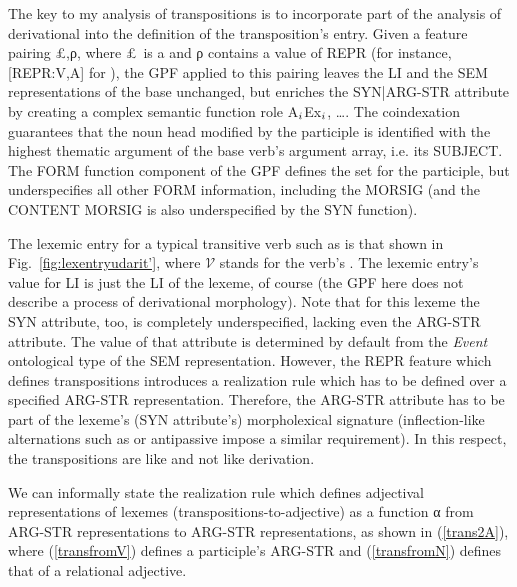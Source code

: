 \documentclass[output=paper,
modfonts
]{LSP/langsci}
\begin{document}
The key to my analysis of transpositions is to incorporate part of the analysis of derivational  into the definition of the transposition’s entry. Given a feature pairing \lab\pounds,ρ\rab, where \pounds\ is a  and ρ contains a value of REPR (for instance, [REPR:\lab V,A\rab] for ), the GPF applied to this pairing leaves the LI and the SEM representations of the base unchanged, but enriches the SYN|ARG-STR attribute by creating a complex semantic function role \lab A$\sb{i}$\lab E\lab x$\sb{i}$, \ldots\rab\rab\rab. The coindexation guarantees that the noun head modified by the participle is identified with the highest thematic argument of the base verb’s argument array, i.e. its SUBJECT. %
The FORM function component of the GPF defines the  set for the participle, but underspecifies all other FORM information, including the MORSIG (and the CONTENT  MORSIG is also underspecified by the SYN function). 


The lexemic entry for a typical transitive  verb such as  is that shown in Fig.~\ref{fig:lexentryudarit’}, where $\mathcal{V}$ stands for the verb’s . The lexemic entry’s value for LI is just the LI of the lexeme, of course (the GPF here does not describe  a process of derivational morphology). %
Note that for this lexeme the SYN attribute, too, is completely underspecified, lacking even the ARG-STR attribute. The value of that attribute is determined by default from the \emph{Event} ontological type of the SEM representation. However, the REPR feature which defines transpositions introduces a realization rule which has to be defined over a specified ARG-STR representation. Therefore, the ARG-STR attribute has to be part of the lexeme’s (SYN attribute’s) morpholexical signature (inflection-like  alternations such as  or antipassive impose a similar requirement). In this respect, the transpositions are like  and not like derivation. %


We can informally state the realization rule which defines adjectival representations of lexemes (transpositions-to-adjective) as a function α from ARG-STR representations to ARG-STR representations, as shown in (\ref{trans2A}), where (\ref{transfromV}) defines a participle’s ARG-STR and (\ref{transfromN}) defines that of a relational adjective.
\end{document}
